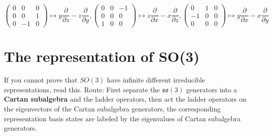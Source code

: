 \documentclass{article}
\begin{document}
	\begin{equation*}
		\begin{pmatrix}
			0 & 0 & 0\\
			0 & 0 & 1\\
			0 & -1 & 0
		\end{pmatrix} \mapsto y\frac{\partial }{\partial z} -z\frac{\partial }{\partial y} ,\begin{pmatrix}
			0 & 0 & -1\\
			0 & 0 & 0\\
			1 & 0 & 0
		\end{pmatrix} \mapsto z\frac{\partial }{\partial x} -x\frac{\partial }{\partial z} ,\begin{pmatrix}
			0 & 1 & 0\\
			-1 & 0 & 0\\
			0 & 0 & 0
		\end{pmatrix} \mapsto y\frac{\partial }{\partial x} -x\frac{\partial }{\partial y}
	\end{equation*}
	
	\section{The representation of SO(3)}
	
	If you cannot prove that $SO( 3)$ have infinite different irreducible representations, read this. Route: First separate the $\mathfrak{so}( 3)$ generators into a \textbf{Cartan subalgebra} and the ladder operators, then act the ladder operators on the eigenvectors of the Cartan subalgebra generators, the corresponding representation basis states are labeled by the eigenvalues of Cartan subalgebra generators. 
	
\end{document}
